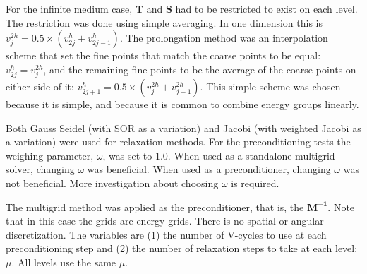\documentclass[12pt, letterpaper]{article}
\newcommand{\ve}[1]{\ensuremath{\mathbf{#1}}}
\begin{document}
For the infinite medium case, \ve{T} and \ve{S} had to be restricted to exist on each level. The restriction was done using simple averaging. In one dimension this is $v^{2h}_{j} = 0.5 \times (v^{h}_{2j} + v^{h}_{2j-1})$. The prolongation method was an interpolation scheme that set the fine points that match the coarse points to be equal: $v^{h}_{2j} = v^{2h}_{j}$, and the remaining fine points to be the average of the coarse points on either side of it: $v^{h}_{2j+1} = 0.5 \times (v^{2h}_{j} + v^{2h}_{j+1})$. This simple scheme was chosen because it is simple, and because it is common to combine energy groups linearly. 

Both Gauss Seidel (with SOR as a variation) and Jacobi (with weighted Jacobi as a variation) were used for relaxation methods. For the preconditioning tests the weighing parameter, $\omega$, was set to $1.0$. When used as a standalone multigrid solver, changing $\omega$ was beneficial. When used as a preconditioner, changing $\omega$ was not beneficial. More investigation about choosing $\omega$ is required. 

The multigrid method was applied as the preconditioner, that is, the $\ve{M^{-1}}$. Note that in this case the grids are energy grids. There is no spatial or angular discretization. The variables are (1) the number of V-cycles to use at each preconditioning step and (2) the number of relaxation steps to take at each level: $\mu$. All levels use the same $\mu$. 
\end{document}
